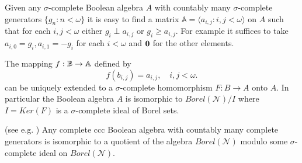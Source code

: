 \smallskip

Given any $\sigma$-complete Boolean algebra $A$ with countably many $\sigma$-complete generators
$\{g_n:n<\omega\}$ it is easy to find a matrix ${\mathbb A}=\langle a_{i,j}:i,j<\omega\rangle$ on $A$ such that for each $i,j<\omega$ either $g_i\perp a_{i,j}$ or
$g_i\geq a_{i,j}$. For example it suffices to take $a_{i,0}=g_i,a_{i,1}=-g_i$ for each $i<\omega$ and $\hbox{\bf 0}$ for the other elements.

\begin{theorem}\label{l_s_z}
The mapping $f:{\mathbb B}\to{\mathbb A}$ defined by
$$ %
f(b_{i,j})=a_{i,j},\quad i,j<\omega.
$$ %
can be uniquely extended to a $\sigma$-complete homomorphism $F:B\to A$ onto $A$. In particular the Boolean algebra $A$ is isomorphic to $Borel({\mathcal N})/I$ where
$I=Ker(F)$ is a $\sigma$-complete ideal of Borel sets.
\end{theorem}

\begin{corollary}(see e.g. \cite{fremlin:cms})
Any complete ccc Boolean algebra with countably many complete generators is isomorphic to a quotient of the algebra $Borel({\mathcal N})$ modulo some
$\sigma$-complete ideal on $Borel({\mathcal N})$.
\end{corollary}


